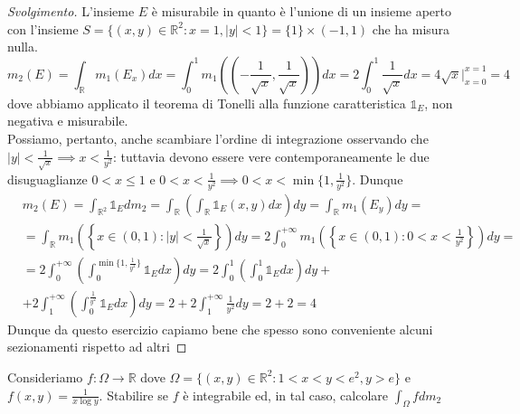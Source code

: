 \begin{proof}[Svolgimento]
	L'insieme $E$ è misurabile in quanto è l'unione di un insieme aperto con l'insieme $S=\{(x, y) \in \mathbb{R}^2 : x=1, |y| < 1 \} = \{1\} \times (-1, 1)$ che ha misura nulla. \\
	$$
	m_2(E) = \int_{\mathbb{R}} m_1(E_x)dx = \int_0^1 m_1\left( \left(-\frac{1}{\sqrt{x}}, \frac{1}{\sqrt{x}} \right) \right)dx = 2 \int_0^1 \frac{1}{\sqrt{x}}dx = 4\sqrt{x}\Bigg|^{x=1}_{x=0} = 4
	$$
	dove abbiamo applicato il teorema di Tonelli alla funzione caratteristica $\mathbb{1}_E$, non negativa e misurabile. \\
	Possiamo, pertanto, anche scambiare l'ordine di integrazione osservando che $|y| < \frac{1}{\sqrt{x}} \implies x < \frac{1}{y^2}$: tuttavia devono essere vere contemporaneamente le due disuguaglianze $0 < x \leq 1$ e $0 < x < \frac{1}{y^2} \implies 0 < x < \min\{1, \frac{1}{y^2}\}$. Dunque
	\begin{align*}
	&m_2(E) = \int_{\mathbb{R}^2} \mathbb{1}_E dm_2 = \int_\mathbb{R} \left( \int_\mathbb{R} \mathbb{1}_E(x,y)dx \right)dy = \int_\mathbb{R} m_1(E_y)dy = \\
	&=\int_{\mathbb{R}} m_1 \left( \left\{x \in (0, 1) : |y| < \frac{1}{\sqrt{x}} \right\} \right)dy =2 \int_0^{+\infty} m_1 \left( \left\{x \in (0,1) : 0 < x < \frac{1}{y^2} \right\} \right)dy = \\
	&=2 \int_0^{+\infty} \left( \int_0^{\min\{1, \frac{1}{y^2}\}} \mathbb{1}_E dx \right)dy = 2 \int_0^1 \left( \int_0^1 \mathbb{1}_E dx \right)dy + \\
	&+2\int_1^{+\infty} \left( \int_0^{\frac{1}{y^2}} \mathbb{1}_E dx \right)dy = 2 + 2\int_1^{+\infty} \frac{1}{y^2}dy = 2 + 2 = 4
	\end{align*}
	Dunque da questo esercizio capiamo bene che spesso sono conveniente alcuni sezionamenti rispetto ad altri
\end{proof}
\begin{exercise}
	Consideriamo $f: \Omega \to \mathbb{R}$ dove $\Omega = \{(x, y) \in \mathbb{R}^2 : 1 < x < y < e^2, y > e \}$ e $f(x,y) = \frac{1}{x\log{y}}$. Stabilire se $f$ è integrabile ed, in tal caso, calcolare $\int_\Omega f dm_2$
\end{exercise}
